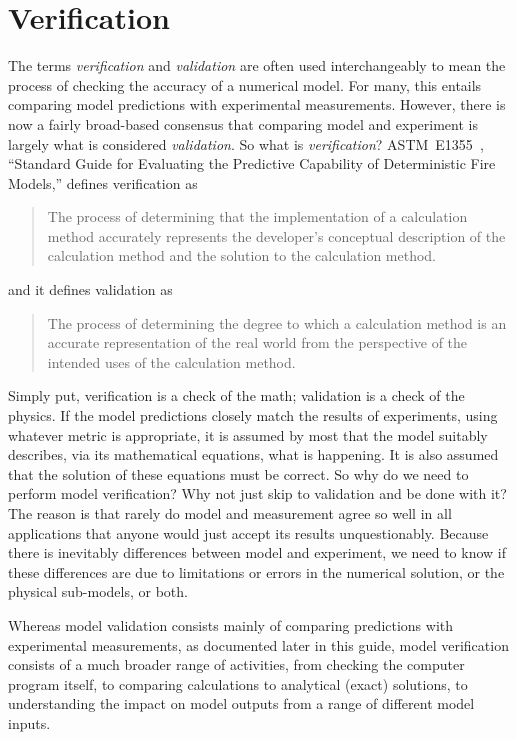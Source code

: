 
\chapter{Verification}

The terms {\em verification} and {\em validation} are often used interchangeably to mean the process of checking the accuracy of a numerical model. For many, this entails comparing model predictions with experimental measurements. However, there is now a fairly broad-based consensus that comparing model and experiment is largely what is considered {\em validation}. So what is {\em verification}? ASTM~E1355~\cite{CFAST:ASTM:E1355}, ``Standard Guide for Evaluating the Predictive Capability of Deterministic Fire Models,'' defines verification as
\begin{quote}
The process of determining that the implementation of a calculation method accurately represents the developer's conceptual description of the calculation method and the solution to the calculation method.
\end{quote}
and it defines validation as
\begin{quote}
The process of determining the degree to which a calculation method is an accurate representation of the real world from the perspective of the intended uses of the calculation method.
\end{quote}
Simply put, verification is a check of the math; validation is a check of the physics. If the model predictions closely match the results of experiments, using whatever metric is appropriate, it is assumed by most that the model suitably describes, via its mathematical equations, what is happening. It is also assumed that the solution of these equations must be correct. So why do we need to perform model verification? Why not just skip to validation and be done with it? The reason is that rarely do model and measurement agree so well in all applications that anyone would just accept its results unquestionably. Because there is inevitably differences between model and experiment, we need to know if these differences are due to limitations or errors in the numerical solution, or the physical sub-models, or both.

Whereas model validation consists mainly of comparing predictions with experimental measurements, as documented later in this guide, model verification consists of a much broader range of activities, from checking the computer program itself, to comparing calculations to analytical (exact) solutions, to understanding the impact on model outputs from a range of different model inputs.

